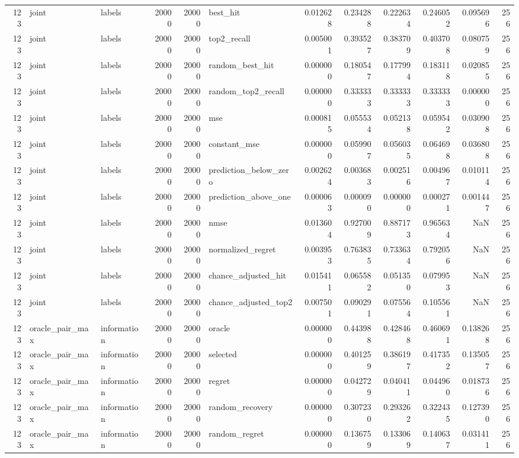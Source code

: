 \begin{tabular}{rllrrlrrrrrr}
123 & joint & labels & 20000 & 20000 & best_hit & 0.012628 & 0.234288 & 0.222634 & 0.246052 & 0.095696 & 256 \\
123 & joint & labels & 20000 & 20000 & top2_recall & 0.005001 & 0.393527 & 0.383709 & 0.403708 & 0.080759 & 256 \\
123 & joint & labels & 20000 & 20000 & random_best_hit & 0.000000 & 0.180547 & 0.177994 & 0.183118 & 0.020855 & 256 \\
123 & joint & labels & 20000 & 20000 & random_top2_recall & 0.000000 & 0.333333 & 0.333333 & 0.333333 & 0.000000 & 256 \\
123 & joint & labels & 20000 & 20000 & mse & 0.000815 & 0.055534 & 0.052138 & 0.059542 & 0.030908 & 256 \\
123 & joint & labels & 20000 & 20000 & constant_mse & 0.000000 & 0.059907 & 0.056035 & 0.064698 & 0.036808 & 256 \\
123 & joint & labels & 20000 & 20000 & prediction_below_zero & 0.002624 & 0.003683 & 0.002516 & 0.004967 & 0.010114 & 256 \\
123 & joint & labels & 20000 & 20000 & prediction_above_one & 0.000063 & 0.000090 & 0.000000 & 0.000271 & 0.001447 & 256 \\
123 & joint & labels & 20000 & 20000 & nmse & 0.013604 & 0.927009 & 0.887173 & 0.965634 & NaN & 256 \\
123 & joint & labels & 20000 & 20000 & normalized_regret & 0.003953 & 0.763835 & 0.733634 & 0.792056 & NaN & 256 \\
123 & joint & labels & 20000 & 20000 & chance_adjusted_hit & 0.015411 & 0.065582 & 0.051350 & 0.079953 & NaN & 256 \\
123 & joint & labels & 20000 & 20000 & chance_adjusted_top2 & 0.007501 & 0.090291 & 0.075564 & 0.105561 & NaN & 256 \\
123 & oracle_pair_max & information & 20000 & 20000 & oracle & 0.000000 & 0.443988 & 0.428468 & 0.460691 & 0.138268 & 256 \\
123 & oracle_pair_max & information & 20000 & 20000 & selected & 0.000000 & 0.401259 & 0.386197 & 0.417352 & 0.135057 & 256 \\
123 & oracle_pair_max & information & 20000 & 20000 & regret & 0.000000 & 0.042729 & 0.040411 & 0.044960 & 0.018736 & 256 \\
123 & oracle_pair_max & information & 20000 & 20000 & random_recovery & 0.000000 & 0.307230 & 0.293262 & 0.322435 & 0.127390 & 256 \\
123 & oracle_pair_max & information & 20000 & 20000 & random_regret & 0.000000 & 0.136759 & 0.133069 & 0.140637 & 0.031411 & 256 \\

\end{tabular}
